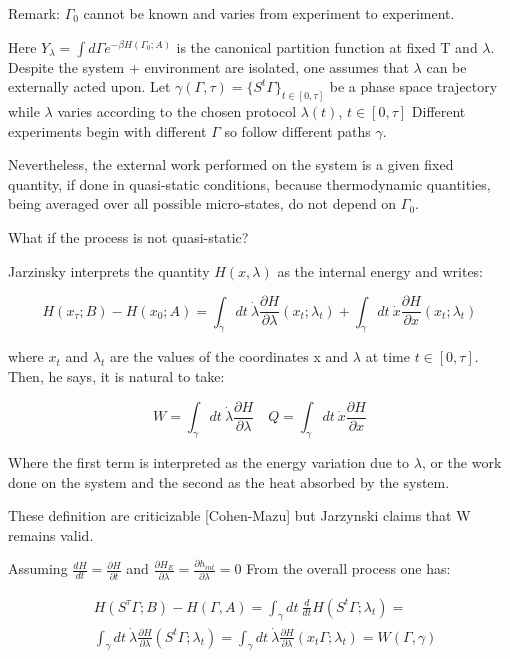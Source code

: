 \documentclass{article}
\begin{document}
Remark: $\Gamma_0$ cannot be known and varies from experiment to experiment.

Here $ Y_{\lambda} = \int d \Gamma  e^{-\beta H(\Gamma_0;A)} $ is the canonical partition function at fixed T and $\lambda$. Despite the system + environment are isolated, one assumes that $\lambda$ can be externally acted upon. Let $\gamma(\Gamma,\tau) = \{ S^t \Gamma \}_{t \in [0,\tau]}$ be a phase space trajectory while $\lambda$ varies according to the chosen protocol $\lambda(t)$, $t \in [0,\tau]$ Different experiments begin with different $\Gamma$ so follow different paths $\gamma$.

Nevertheless, the external work performed on the system is a given fixed quantity, if done in quasi-static conditions, because thermodynamic quantities, being averaged over all possible micro-states, do not depend on $\Gamma_0$.

What if the process is not quasi-static?

Jarzinsky interprets the quantity $H(x,\lambda)$ as the internal energy and writes:

\begin{equation}
H(x_{\tau};B) - H(x_0;A) = \int_{\gamma} dt \ \dot{\lambda} \frac{\partial H}{\partial \lambda}(x_t;\lambda_t) + \int_{\gamma} dt \ \dot{x} \frac{\partial H}{\partial x}(x_t;\lambda_t)
\end{equation}

where $x_t$ and $\lambda_t$ are the values of the coordinates x and $\lambda$ at time $t \in [0,\tau]$. Then, he says, it is natural to take:

\begin{equation}
W = \int_{\gamma} dt \ \dot{\lambda} \frac{\partial H}{\partial \lambda} \quad Q = \int_{\gamma} dt \ \dot{x} \frac{\partial H}{\partial x}
\end{equation}

Where the first term is interpreted as the energy variation due to $\lambda$, or the work done on the system and the second as the heat absorbed by the system.

These definition are criticizable [Cohen-Mazu] but Jarzynski claims that W remains valid.

Assuming $\frac{d H}{dt} = \frac{\partial H}{\partial t}$ and $\frac{\partial H_E}{\partial \lambda} = \frac{\partial h_{int}}{\partial \lambda} = 0$
From the overall process one has:

\begin{align*}
& H(S^{\tau} \Gamma; B) - H(\Gamma, A) = \int_{\gamma} dt \ \frac{d}{dt} H(S^t \Gamma; \lambda_t) = \\
& \int_{\gamma} dt \ \dot{\lambda} \frac{\partial H}{\partial \lambda}(S^t \Gamma; \lambda_t) = \int_{\gamma} dt \ \dot{\lambda} \frac{\partial H}{\partial \lambda}(x_t \Gamma; \lambda_t) = W(\Gamma,\gamma)
\end{align*}
\end{document}
